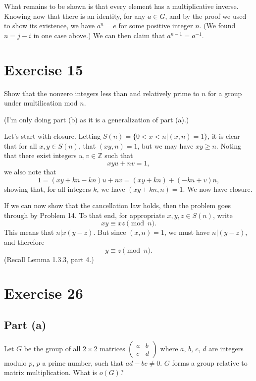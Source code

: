 \documentclass[12pt]{article}
\newcommand{\Z}{\mathbb{Z}}
\begin{document}
What remains to be shown is that every element has a multiplicative inverse.  Knowing now that
there is an identity, for any $a\in G$, and by the proof we used to show its existence, we have $a^n=e$ for some positive integer $n$.
(We found $n=j-i$ in one case above.)
We can then claim that $a^{n-1}=a^{-1}$.

\section*{Exercise 15}

Show that the nonzero integers less than and relatively prime to $n$ for a group under multilication mod $n$.

(I'm only doing part (b) as it is a generalization of part (a).)

Let's start with closure.  Letting $S(n) = \{0<x<n|(x,n)=1\}$, it is clear that
for all $x,y\in S(n)$, that $(xy,n)=1$, but we may have $xy\geq n$.
Noting that there exist integers $u,v\in\Z$ such that
\begin{equation*}
xyu + nv = 1,
\end{equation*}
we also note that
\begin{equation*}
1 = (xy + kn - kn)u + nv = (xy + kn) + (-ku + v)n,
\end{equation*}
showing that, for all integers $k$, we have $(xy + kn,n)=1$.  We now have closure.

If we can now show that the cancellation law holds, then the problem goes through by Problem 14.
To that end, for appropriate $x,y,z\in S(n)$, write
\begin{equation*}
xy\equiv xz\pmod{n}.
\end{equation*}
This means that $n|x(y-z)$.  But since $(x,n)=1$, we must have $n|(y-z)$, and
therefore
\begin{equation*}
y\equiv z\pmod{n}.
\end{equation*}
(Recall Lemma 1.3.3, part 4.)

\section*{Exercise 26}

\subsection*{Part (a)}

Let $G$ be the group of all $2\times 2$ matrices $\left(\begin{array}{cc}a&b\\c&d\end{array}\right)$
where $a$, $b$, $c$, $d$ are integers modulo $p$, $p$ a prime number, such that $ad-bc\neq 0$.
$G$ forms a group relative to matrix multiplication.  What is $o(G)$?
\end{document}
